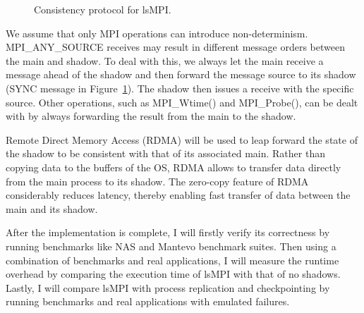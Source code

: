 \begin{figure}[!t]
  \begin{center}
  \end{center}
  \caption{Consistency protocol for lsMPI.}
  \label{fig:cons_protocol}
\end{figure}

We assume that only MPI operations can introduce non-determinism. MPI\_ANY\_SOURCE receives may result in different message orders between the main and shadow. To deal with this, we always let the main receive a message ahead of the shadow and then forward the message source to its shadow (SYNC message in Figure~\ref{fig:cons_protocol}). 
The shadow then issues a receive with the specific source. Other operations, such as MPI\_Wtime() and MPI\_Probe(), can be dealt with by always forwarding the result from the main to the shadow.

Remote Direct Memory Access (RDMA) will be used to leap forward the state of the shadow to be consistent with that of its associated main. Rather than copying data to the buffers of the OS, RDMA allows to transfer data directly from the main process to its shadow. The zero-copy feature of RDMA considerably reduces latency, thereby enabling fast transfer of data between the main and its shadow.

After the implementation is complete, I will firstly verify its correctness by running benchmarks like NAS and Mantevo benchmark suites. Then using a combination of benchmarks and real applications, I will measure the runtime overhead by comparing the execution time of lsMPI with that of no shadows. Lastly, I will compare lsMPI with process replication and checkpointing by running benchmarks and real applications with emulated failures.

